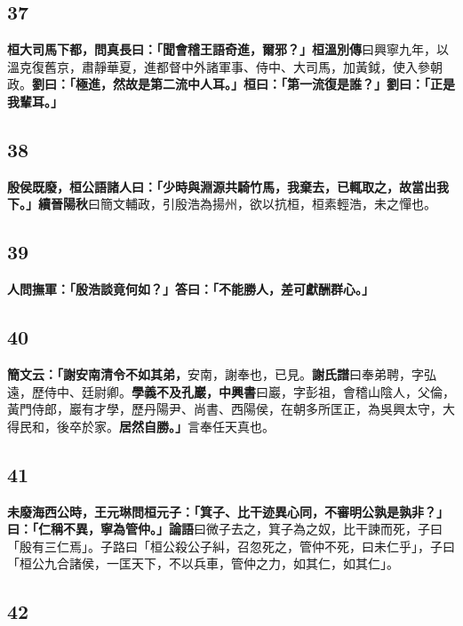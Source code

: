 \subsection*{37}

\textbf{桓大司馬下都，問真長曰：「聞會稽王語奇進，爾邪？」}{\footnotesize \textbf{桓溫別傳}曰興寧九年，以溫克復舊京，肅靜華夏，進都督中外諸軍事、侍中、大司馬，加黃鉞，使入參朝政。}\textbf{劉曰：「極進，然故是第二流中人耳。」桓曰：「第一流復是誰？」劉曰：「正是我輩耳。」}

\subsection*{38}

\textbf{殷侯既廢，桓公語諸人曰：「少時與淵源共騎竹馬，我棄去，已輒取之，故當出我下。」}{\footnotesize \textbf{續晉陽秋}曰簡文輔政，引殷浩為揚州，欲以抗桓，桓素輕浩，未之憚也。}

\subsection*{39}

\textbf{人問撫軍：「殷浩談竟何如？」答曰：「不能勝人，差可獻酬群心。」}

\subsection*{40}

\textbf{簡文云：「謝安南清令不如其弟，}{\footnotesize 安南，謝奉也，已見。\textbf{謝氏譜}曰奉弟聘，字弘遠，歷侍中、廷尉卿。}\textbf{學義不及孔巖，}{\footnotesize \textbf{中興書}曰巖，字彭祖，會稽山陰人，父倫，黃門侍郎，巖有才學，歷丹陽尹、尚書、西陽侯，在朝多所匡正，為吳興太守，大得民和，後卒於家。}\textbf{居然自勝。」}{\footnotesize 言奉任天真也。}

\subsection*{41}

\textbf{未廢海西公時，王元琳問桓元子：「箕子、比干迹異心同，不審明公孰是孰非？」曰：「仁稱不異，寧為管仲。」}{\footnotesize \textbf{論語}曰微子去之，箕子為之奴，比干諫而死，子曰「殷有三仁焉」。子路曰「桓公殺公子糾，召忽死之，管仲不死，曰未仁乎」，子曰「桓公九合諸侯，一匡天下，不以兵車，管仲之力，如其仁，如其仁」。}

\subsection*{42}

